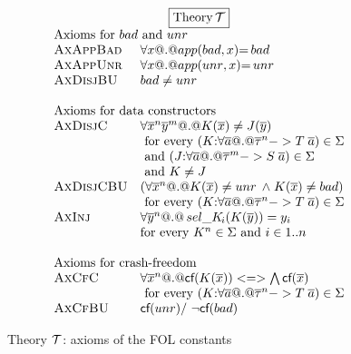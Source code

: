 \begin{figure}\small
\setlength{\arraycolsep}{1pt}
\[\begin{array}{c}
\ruleform{\text{Theory}\,\Th} \\
\begin{array}{ll}
\multicolumn{2}{l}{\text{Axioms for $bad$ and $unr$}} \\
 \textsc{AxAppBad}  & \formula{\forall x @.@ app(\bad,x){=}\bad}  \\
 \textsc{AxAppUnr}  & \formula{\forall x @.@ app(\unr,x){=}\unr}    \\
 \textsc{AxDisjBU} & \formula{\bad \neq \unr}  \\
\\
\multicolumn{2}{l}{\mbox{Axioms for data constructors}} \\
 \textsc{AxDisjC} & \formula{\forall \oln{x}{n}\oln{y}{m} @.@ K(\ol{x}) \neq J(\ol{y})} \\
                  & \text{ for every } (K{:}\forall\as @.@ \oln{\tau}{n} -> T\;\as) \in \Sigma \\
                  & \text{ and } (J{:}\forall\as @.@ \oln{\tau}{m} -> S\;\as) \in \Sigma \\
                  & \text{ and } K \neq J \\
 \textsc{AxDisjCBU} & \formula{(\forall \oln{x}{n} @.@ K(\ol{x}) \neq \unr \; \land \; K(\ol{x}) \neq \bad)} \\
                  & \text{ for every } (K{:}\forall\as @.@ \oln{\tau}{n} -> T\;\as) \in \Sigma \\
 \textsc{AxInj}   & \formula{\forall \oln{y}{n} @.@ \sel{K}{i}(K(\ys)) = y_i} \\
                  & \text{for every } K^\ar \in \Sigma \text{ and } i \in 1..n \\
\\
\multicolumn{2}{l}{\mbox{Axioms for crash-freedom}} \\
 \textsc{AxCfC}  & \formula{\forall \oln{x}{n} @.@ \lcf{K(\ol{x})} <=> \bigwedge\lcf{\ol{x}}} \\
                 & \text{ for every } (K{:}\forall\as @.@ \oln{\tau}{n} -> T\;\as) \in \Sigma \\
 \textsc{AxCfBU} & \formula{\lcf{\unr} /\ \lncf{\bad}} \\
\end{array}
\end{array}\]
\caption{Theory ${\cal T}$: axioms of the FOL constants}\label{fig:prelude} \label{fig:data-cons}
\end{figure}

